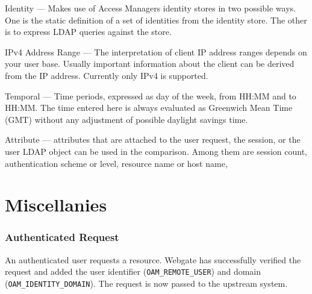 \documentclass[11pt]{report}
\begin{document}
\begin{description}

    \item{Identity} --- Makes use of Access Managers identity stores in two
        possible ways. One is the static definition of a set of identities from
        the identity store. The other is to express LDAP queries against the
        store.

    \item{IPv4 Address Range} --- The interpretation of client IP address
        ranges depends on your user base. Usually important information about
        the client can be derived from the IP address. Currently only IPv4 is
        supported.

    \item{Temporal} --- Time periods, expressed as day of the week, from HH:MM
        and to HH:MM\@.  The time entered here is always evaluated as Greenwich
        Mean Time (GMT) without any adjustment of possible daylight savings
        time.

    \item{Attribute} --- attributes that are attached to the user request, the
        session, or the user LDAP object can be used in the comparison. Among
        them are session count, authentication scheme or level, resource name
        or host name,

\end{description}




\chapter{Miscellanies}


\subsection{Authenticated Request}

An authenticated user requests a resource. Webgate has successfully verified the
request and added the user identifier (\verb|OAM_REMOTE_USER|) and domain
(\verb|OAM_IDENTITY_DOMAIN|). The request is now passed to the upstream system.
\end{document}
